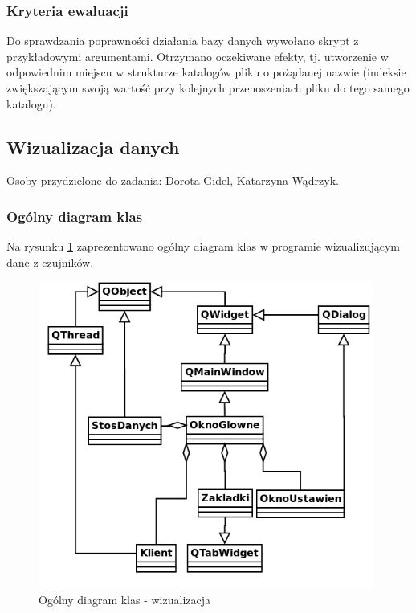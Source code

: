 \documentclass{article}
\begin{document}
\subsubsection{Kryteria ewaluacji}
Do sprawdzania poprawności działania bazy danych wywołano skrypt z przykładowymi argumentami. Otrzymano oczekiwane efekty, tj. utworzenie w odpowiednim miejscu w strukturze katalogów pliku o pożądanej nazwie (indeksie zwiększającym swoją wartość przy kolejnych przenoszeniach pliku do tego samego katalogu).

\subsection{Wizualizacja danych}
Osoby przydzielone do zadania: Dorota Gidel, Katarzyna Wądrzyk.

\subsubsection{Ogólny diagram klas}
Na rysunku \ref{rys:diagram_ogolny} zaprezentowano ogólny diagram klas w programie wizualizującym dane z czujników.
\begin{figure}[H]
    \centering
    \includegraphics[width=11cm]{diagram_ogolny.png}
    \caption{Ogólny diagram klas - wizualizacja}
    \label{rys:diagram_ogolny}
\end{figure}
\end{document}
